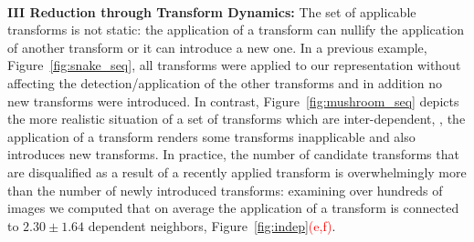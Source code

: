

\noindent\\
{\bf III Reduction through Transform Dynamics: } The set of applicable transforms is not static: the application of a transform can nullify the application of another transform or it can introduce a new one. In a previous example, Figure~\ref{fig:snake_seq}, all transforms were applied to our representation without affecting the detection/application of the other transforms and in addition no new transforms were introduced. In contrast, Figure~\ref{fig:mushroom_seq} depicts the more realistic situation of a set of transforms which are inter-dependent, \ie, the application of a transform renders some transforms inapplicable and also introduces new transforms. In practice, the number of candidate transforms that are disqualified as a result of a recently applied transform is overwhelmingly more than the number of newly introduced transforms: examining over hundreds of images we computed that on average the application of a transform is connected to $2.30\pm1.64$ dependent neighbors, Figure~\ref{fig:indep}\textcolor{red}{(e,f)}. 


